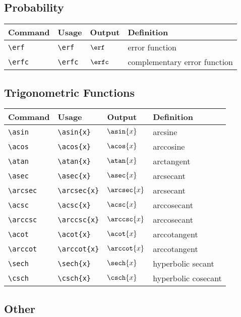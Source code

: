 \documentclass[11pt]{article}
\begin{document}
\subsection{Probability}

\begin{tabular}{llll}
    Command      & Usage        & Output  & Definition                   \\
    \hline
    \verb|\erf|  & \verb|\erf|  & $\erf$  & error function               \\
    \verb|\erfc| & \verb|\erfc| & $\erfc$ & complementary error function \\
\end{tabular}

\subsection{Trigonometric Functions}

\begin{tabular}{llll}
    Command        & Usage             & Output       & Definition          \\
    \hline
    \verb|\asin|   & \verb|\asin{x}|   & $\asin{x}$   & arcsine             \\
    \verb|\acos|   & \verb|\acos{x}|   & $\acos{x}$   & arccosine           \\
    \verb|\atan|   & \verb|\atan{x}|   & $\atan{x}$   & arctangent          \\
    \verb|\asec|   & \verb|\asec{x}|   & $\asec{x}$   & arcsecant           \\
    \verb|\arcsec| & \verb|\arcsec{x}| & $\arcsec{x}$ & arcsecant           \\
    \verb|\acsc|   & \verb|\acsc{x}|   & $\acsc{x}$   & arccosecant         \\
    \verb|\arccsc| & \verb|\arccsc{x}| & $\arccsc{x}$ & arccosecant         \\
    \verb|\acot|   & \verb|\acot{x}|   & $\acot{x}$   & arccotangent        \\
    \verb|\arccot| & \verb|\arccot{x}| & $\arccot{x}$ & arccotangent        \\
    \verb|\sech|   & \verb|\sech{x}|   & $\sech{x}$   & hyperbolic secant   \\
    \verb|\csch|   & \verb|\csch{x}|   & $\csch{x}$   & hyperbolic cosecant \\
\end{tabular}

\subsection{Other}
\end{document}
